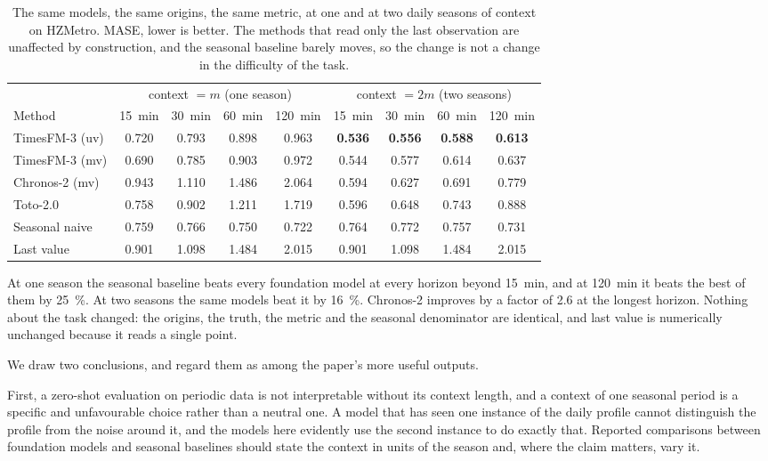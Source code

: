 \documentclass[11pt]{article}
\theoremstyle{plain}
\theoremstyle{definition}
\theoremstyle{remark}
\newcommand{\best}[1]{\textbf{#1}}
\begin{document}
\begin{table}[htbp]
\centering
\caption{The same models, the same origins, the same metric, at one and at two daily seasons of context on HZMetro. MASE, lower is better. The methods that read only the last observation are unaffected by construction, and the seasonal baseline barely moves, so the change is not a change in the difficulty of the task.}
\label{tab:context}
\small
\begin{tabular}{lcccc@{\hskip 2em}cccc}
\toprule
& \multicolumn{4}{c}{context $=m$ (one season)} & \multicolumn{4}{c}{context $=2m$ (two seasons)} \\
\cmidrule(lr){2-5}\cmidrule(lr){6-9}
Method & \SI{15}{\minute} & \SI{30}{\minute} & \SI{60}{\minute} & \SI{120}{\minute} & \SI{15}{\minute} & \SI{30}{\minute} & \SI{60}{\minute} & \SI{120}{\minute} \\
\midrule
TimesFM-3 (uv)     & 0.720 & 0.793 & 0.898 & 0.963 & \best{0.536} & \best{0.556} & \best{0.588} & \best{0.613} \\
TimesFM-3 (mv)     & 0.690 & 0.785 & 0.903 & 0.972 & 0.544 & 0.577 & 0.614 & 0.637 \\
Chronos-2 (mv)     & 0.943 & 1.110 & 1.486 & 2.064 & 0.594 & 0.627 & 0.691 & 0.779 \\
Toto-2.0           & 0.758 & 0.902 & 1.211 & 1.719 & 0.596 & 0.648 & 0.743 & 0.888 \\
\midrule
Seasonal naive     & 0.759 & 0.766 & 0.750 & 0.722 & 0.764 & 0.772 & 0.757 & 0.731 \\
Last value         & 0.901 & 1.098 & 1.484 & 2.015 & 0.901 & 1.098 & 1.484 & 2.015 \\
\bottomrule
\end{tabular}
\end{table}

At one season the seasonal baseline beats every foundation model at every horizon beyond \SI{15}{\minute}, and at \SI{120}{\minute} it beats the best of them by \SI{25}{\percent}. At two seasons the same models beat it by \SI{16}{\percent}. Chronos-2 improves by a factor of \num{2.6} at the longest horizon. Nothing about the task changed: the origins, the truth, the metric and the seasonal denominator are identical, and last value is numerically unchanged because it reads a single point.

We draw two conclusions, and regard them as among the paper's more useful outputs.

First, a zero-shot evaluation on periodic data is not interpretable without its context length, and a context of one seasonal period is a specific and unfavourable choice rather than a neutral one. A model that has seen one instance of the daily profile cannot distinguish the profile from the noise around it, and the models here evidently use the second instance to do exactly that. Reported comparisons between foundation models and seasonal baselines should state the context in units of the season and, where the claim matters, vary it.
\end{document}
